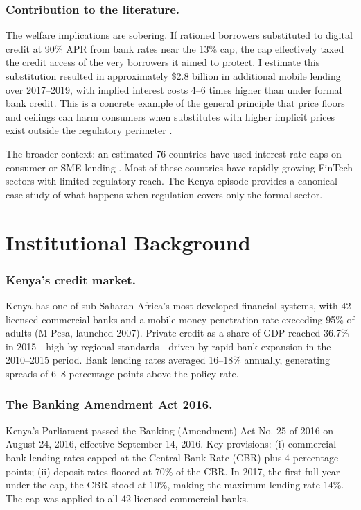 \documentclass[12pt]{article}
\begin{document}
\subsubsection*{Contribution to the literature.}
The welfare implications are sobering. If rationed borrowers substituted to digital credit at 90\% APR from bank rates near the 13\% cap, the cap effectively taxed the credit access of the very borrowers it aimed to protect. I estimate this substitution resulted in approximately \$2.8 billion in additional mobile lending over 2017--2019, with implied interest costs 4--6 times higher than under formal bank credit. This is a concrete example of the general principle that price floors and ceilings can harm consumers when substitutes with higher implicit prices exist outside the regulatory perimeter \citep{shapiro_stiglitz_1984,besley_2004}.

The broader context: an estimated 76 countries have used interest rate caps on consumer or SME lending \citep{world_bank_2020_rate_caps}. Most of these countries have rapidly growing FinTech sectors with limited regulatory reach. The Kenya episode provides a canonical case study of what happens when regulation covers only the formal sector.

\section{Institutional Background}

\subsubsection*{Kenya's credit market.}
Kenya has one of sub-Saharan Africa's most developed financial systems, with 42 licensed commercial banks and a mobile money penetration rate exceeding 95\% of adults (M-Pesa, launched 2007). Private credit as a share of GDP reached 36.7\% in 2015---high by regional standards---driven by rapid bank expansion in the 2010--2015 period. Bank lending rates averaged 16--18\% annually, generating spreads of 6--8 percentage points above the policy rate.

\subsubsection*{The Banking Amendment Act 2016.}
Kenya's Parliament passed the Banking (Amendment) Act No. 25 of 2016 on August 24, 2016, effective September 14, 2016. Key provisions: (i) commercial bank lending rates capped at the Central Bank Rate (CBR) plus 4 percentage points; (ii) deposit rates floored at 70\% of the CBR. In 2017, the first full year under the cap, the CBR stood at 10\%, making the maximum lending rate 14\%. The cap was applied to all 42 licensed commercial banks.
\end{document}
